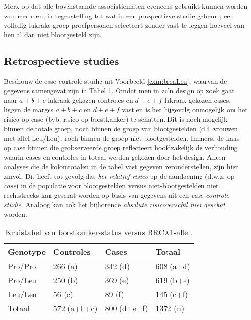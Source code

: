 \documentclass[12pt,dutch,coursenotes]{book}
\theoremstyle{definition}
\theoremstyle{definition}
\theoremstyle{definition}
\theoremstyle{remark}
\begin{document}
Merk op dat alle bovenstaande associatiematen eveneens gebruikt kunnen
worden wanneer men, in tegenstelling tot wat in een prospectieve studie
gebeurt, een volledig lukrake groep proefpersonen selecteert zonder vast
te leggen hoeveel van hen al dan niet blootgesteld zijn.

\subsection{Retrospectieve studies}\label{subsec:retrospect}

Beschouw de case-controle studie uit Voorbeeld \ref{exm:brcaLeu},
waarvan de gegevens samengevat zijn in Tabel \ref{tab:leu2}. Omdat men
in zo'n design op zoek gaat naar \(a+b+c\) lukraak gekozen controles en
\(d+e+f\) lukraak gekozen cases, liggen de marges \(a+b+c\) en \(d+e+f\)
vast en is het bijgevolg onmogelijk om het risico op case (bvb. risico
op borstkanker) te schatten. Dit is noch mogelijk binnen de totale
groep, noch binnen de groep van blootgestelden (d.i. vrouwen met allel
Leu/Leu), noch binnen de groep niet-blootgestelden. Immers, de kans op
case binnen die geobserveerde groep reflecteert hoofdzakelijk de
verhouding waarin cases en controles in totaal werden gekozen door het
design. Alleen analyses die de kolomtotalen in de tabel vast gegeven
veronderstellen, zijn hier zinvol. Dit heeft tot gevolg dat \emph{het
relatief risico} op de aandoening (d.w.z. op \emph{case}) in de
populatie voor blootgestelden versus niet-blootgestelden niet
rechtstreeks kan geschat worden op basis van gegevens uit een
\emph{case-controle studie}. Analoog kan ook het bijhorende
\emph{absolute risicoverschil niet geschat} worden.

\begin{table}

\caption{\label{tab:leu2}Kruistabel van borstkanker-status versus BRCA1-allel.}
\centering
\begin{tabular}[t]{llll}
\toprule
Genotype & Controles & Cases & Totaal\\
\midrule
Pro/Pro & 266 (a) & 342 (d) & 608 (a+d)\\
Pro/Leu & 250 (b) & 369 (e) & 619 (b+e)\\
Leu/Leu & 56 (c) & 89 (f) & 145 (c+f)\\
Totaal & 572 (a+b+c) & 800 (d+e+f) & 1372 (n)\\
\bottomrule
\end{tabular}
\end{table}
\end{document}
